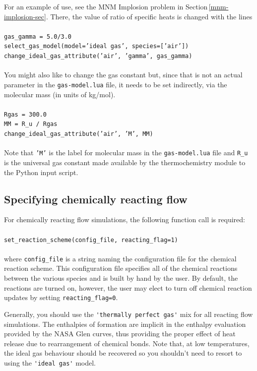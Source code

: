 \medskip
For an example of use, see the MNM Implosion problem in Section\,\ref{mnm-implosion-sec}.
There, the value of ratio of specific heats is changed with the lines\\
%
\topbar\\
\texttt{gas\_gamma = 5.0/3.0}\\
\texttt{select\_gas\_model(model='ideal gas', species=['air'])}\\
\texttt{change\_ideal\_gas\_attribute('air', 'gamma', gas\_gamma)\\}
\bottombar\\
You might also like to change the gas constant but, since that is not an actual parameter in the 
\texttt{gas-model.lua} file, it needs to be set indirectly, via the molecular mass (in units of kg/mol).\\
\topbar\\
\texttt{Rgas = 300.0}\\
\texttt{MM = R\_u / Rgas}\\
\texttt{change\_ideal\_gas\_attribute('air', 'M', MM)\\}
\bottombar\\
Note that \texttt{'M'} is the label for molecular mass in the \texttt{gas-model.lua} file
and \texttt{R\_u} is the universal gas constant made available by the thermochemistry module
to the Python input script.


\subsection{Specifying chemically reacting flow}
For chemically reacting flow simulations, the following function call is
required:\\
%
\topbar\\
\texttt{set\_reaction\_scheme(config\_file, reacting\_flag=1)}\\
\bottombar\\
where \texttt{config\_file} is a string naming the configuration file for the
chemical reaction scheme.  This configuration file specifies all of the chemical
reactions between the various species and is built by hand by the user.
By default, the reactions are turned on, however, the user may elect to turn off
chemical reaction updates by setting \texttt{reacting\_flag=0}.

\medskip
Generally, you should use the \verb!'thermally perfect gas'! mix for all reacting flow simulations.
The enthalpies of formation are implicit in the enthalpy evaluation provided by the NASA Glen curves,
thus providing the proper effect of heat release due to rearrangement of chemical bonds.
Note that, at low temperatures, the ideal gas behaviour should be recovered so you shouldn't need 
to resort to using the \verb!'ideal gas'! model.


